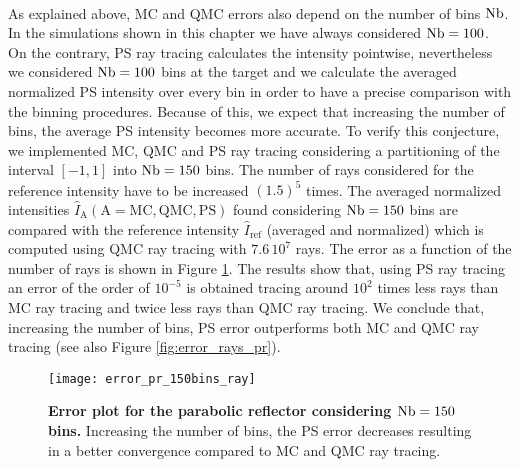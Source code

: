 \\ \indent As explained above, MC and QMC errors also depend on the number of bins $\textrm{Nb}$. In the simulations shown in this chapter we have always considered $\textrm{Nb} = 100$. On the contrary, PS ray tracing calculates the intensity pointwise, nevertheless we considered $\textrm{Nb} = 100$ bins at the target and we calculate the averaged normalized PS intensity over every bin in order to have a precise comparison with the binning procedures. Because of this, we expect that increasing the number of bins, the average PS intensity becomes more accurate. To verify this conjecture, we implemented MC, QMC and PS ray tracing considering a partitioning of the interval $[-1,1]$ into $\textrm{Nb} = 150$ bins. The number of rays considered for the reference intensity have to be increased $(1.5)^5$ times. The averaged normalized intensities $\hat{I}_{\textrm{A}} (\textrm{A}=\textrm{MC}, \textrm{QMC}, \textrm{PS})$ found considering $\textrm{Nb}=150$ bins are compared with the reference intensity $\hat{I}_{\textrm{ref}}$ (averaged and normalized) which is computed using QMC ray tracing with $7.6\, 10^7$ rays. The error as a function of the number of rays is shown in Figure \ref{fig:error_pr_150_bin}. The results show that, using PS ray tracing an error of the order of $10^{-5}$ is obtained tracing around $10^2$ times less rays than MC ray tracing and twice less rays than QMC ray tracing. We conclude that, increasing the number of bins, PS error outperforms both MC and QMC ray tracing (see also Figure \ref{fig:error_rays_pr}).
\begin{figure}[h]
  \center
  \texttt{[image: error\_pr\_150bins\_ray]}
  \caption{\textbf{Error plot for the parabolic reflector considering $\textrm{Nb}=150$ bins.} Increasing the number of bins, the PS error decreases resulting in a better convergence compared to MC and QMC ray tracing.}
  \label{fig:error_pr_150_bin}
\end{figure}
